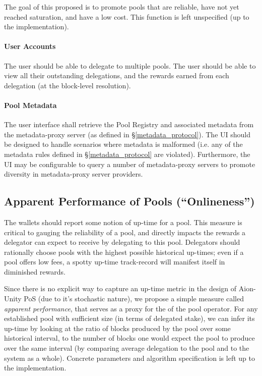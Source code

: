 The goal of this proposed  is to promote pools that are reliable, have not yet reached saturation, and have a low cost. This function is left unspecified (up to the implementation).  

\paragraph*{User Accounts} The user should be able to delegate to multiple pools. The user should be able to view all their outstanding delegations, and the rewards earned from each delegation (at the block-level resolution). 

\paragraph*{Pool Metadata} The user interface shall retrieve the Pool Registry and associated metadata from the metadata-proxy server (as defined in \S\ref{metadata_protocol}). The UI should be designed to handle scenarios where metadata is malformed (i.e. any of the metadata rules defined in \S\ref{metadata_protocol} are violated). Furthermore, the UI may be configurable to query a number of metadata-proxy servers to promote diversity in metadata-proxy server providers. 

\subsection{Apparent Performance of Pools (``Onlineness'')} \label{apparent_perf}

The wallets should report some notion of up-time for a pool. This measure is critical to gauging the reliability of a pool, and directly impacts the rewards a delegator can expect to receive by delegating to this pool. Delegators should rationally choose pools with the highest possible historical up-times; even if a pool offers low fees, a spotty up-time track-record will manifest itself in diminished rewards. 

Since there is no explicit way to capture an up-time metric in the design of Aion-Unity PoS (due to it's stochastic nature), we propose a simple measure called \textit{apparent performance}, that serves as a proxy for the  of the pool operator. For any established pool with sufficient size (in terms of delegated stake), we can infer its up-time by looking at the ratio of blocks produced by the pool over some historical interval, to the number of blocks one would expect the pool to produce over the same interval (by comparing average delegation to the pool and to the system as a whole). Concrete parameters and algorithm specification is left up to the implementation.

